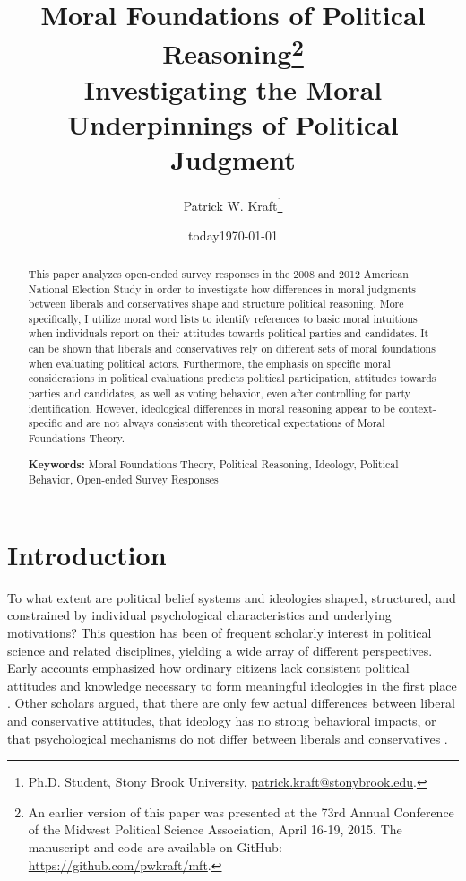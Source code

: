 \documentclass[12pt]{article}
\author{Patrick W. Kraft\footnote{Ph.D. Student, Stony Brook University, \href{mailto:patrick.kraft@stonybrook.edu}{patrick.kraft@stonybrook.edu}.
}}
\date{today}
\title{Moral Foundations of Political Reasoning\footnote{An earlier version of this paper was presented at the 73rd Annual Conference of the Midwest Political Science Association, April 16-19, 2015. The manuscript and code are available on GitHub: \url{https://github.com/pwkraft/mft}.}\\
\large{Investigating the Moral Underpinnings of Political Judgment}}
\date{\today}
\begin{document}
\maketitle
\onehalfspacing

\begin{abstract}
This paper analyzes open-ended survey responses in the 2008 and 2012 American National Election Study in order to investigate how differences in moral judgments between liberals and conservatives shape and structure political reasoning. More specifically, I utilize moral word lists to identify references to basic moral intuitions when individuals report on their attitudes towards political parties and candidates. It can be shown that liberals and conservatives rely on different sets of moral foundations when evaluating political actors. Furthermore, the emphasis on specific moral considerations in political evaluations predicts political participation, attitudes towards parties and candidates, as well as voting behavior, even after controlling for party identification. However, ideological differences in moral reasoning appear to be context-specific and are not always consistent with theoretical expectations of Moral Foundations Theory.

\vspace{\baselineskip}
\noindent \textbf{Keywords:} Moral Foundations Theory, Political Reasoning, Ideology, Political Behavior, Open-ended Survey Responses
\end{abstract}
\newpage

\section{Introduction}

To what extent are political belief systems and ideologies shaped, structured, and constrained by individual psychological characteristics and underlying motivations? This question has been of frequent scholarly interest in political science and related disciplines, yielding a wide array of different perspectives. Early accounts emphasized how ordinary citizens lack consistent political attitudes and knowledge necessary to form meaningful ideologies in the first place \citep[e.g.][]{converse1964nature}. Other scholars argued, that there are only few actual differences between liberal and conservative attitudes, that ideology has no strong behavioral impacts, or that psychological mechanisms do not differ between liberals and conservatives \citep[see][for an overview regarding each of these points]{jost2006end}.
\end{document}
